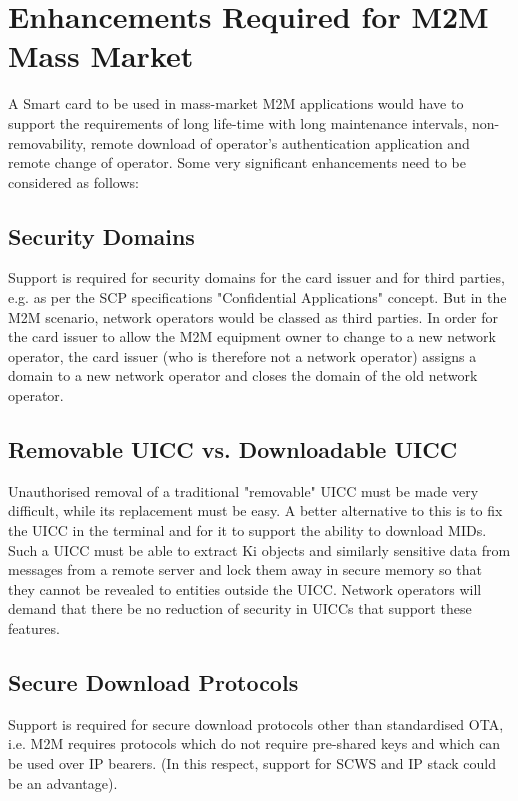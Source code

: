 \documentclass[12pt]{article}
\begin{document}
\section{Enhancements Required for M2M Mass Market}
A Smart card to be used in mass-market M2M applications would have to support the requirements of long life-time with long maintenance intervals, non-removability, remote download of operator’s authentication application and remote change of operator. Some very significant enhancements need to be considered as follows:

\subsection{Security Domains}
Support is required for security domains for the card issuer and for third parties, e.g. as per the SCP specifications "Confidential Applications" concept. But in the M2M scenario, network operators would be classed as third parties. In order for the card issuer to allow the M2M equipment owner to change to a new network operator, the card issuer (who is therefore not a network operator) assigns a domain to a new network operator and closes the domain of the old network operator.

\subsection{Removable UICC vs. Downloadable UICC}
Unauthorised removal of a traditional "removable" UICC must be made very difficult, while its replacement must be easy. A better alternative to this is to fix the UICC in the terminal and for it to support the ability to download MIDs. Such a UICC must be able to extract Ki objects and similarly sensitive data from messages from a remote server and lock them away in secure memory so that they cannot be revealed to entities outside the UICC. Network operators will demand that there be no reduction of security in UICCs that support these features.

\subsection{Secure Download Protocols}
Support is required for secure download protocols other than standardised OTA, i.e. M2M requires protocols which do not require pre-shared keys and which can be used over IP bearers. (In this respect, support for SCWS and IP stack could be an advantage).
\end{document}
